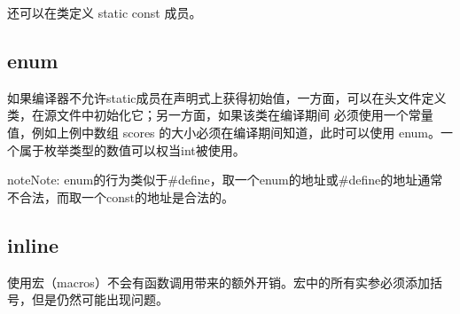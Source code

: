 \documentclass[letterpaper,10pt,english]{sphinxmanual}
\begin{document}
还可以在类定义 static const 成员。

%
\begin{sphinxVerbatim}[commandchars=\\\{\},numbers=left,firstnumber=1,stepnumber=1]
 
        
   \PYG{p}{[}\PYG{p}{]} 
\end{sphinxVerbatim}


\subsection{enum}
\label{\detokenize{cpp/20_define:enum}}
如果编译器不允许static成员在声明式上获得初始值，一方面，可以在头文件定义类，在源文件中初始化它；另一方面，如果该类在编译期间
必须使用一个常量值，例如上例中数组 scores 的大小必须在编译期间知道，此时可以使用 enum。一个属于枚举类型的数值可以权当int被使用。

%
\begin{sphinxVerbatim}[commandchars=\\\{\},numbers=left,firstnumber=1,stepnumber=1]
 
      
   \PYG{p}{[}\PYG{p}{]} 
\end{sphinxVerbatim}

\begin{sphinxadmonition}{note}{Note:}
enum的行为类似于\#define，取一个enum的地址或\#define的地址通常不合法，而取一个const的地址是合法的。
\end{sphinxadmonition}


\subsection{inline}
\label{\detokenize{cpp/20_define:inline}}
使用宏（macros）不会有函数调用带来的额外开销。宏中的所有实参必须添加括号，但是仍然可能出现问题。
\end{document}
